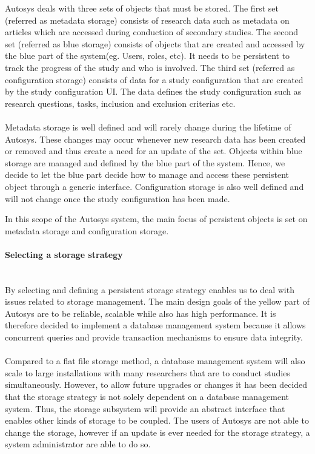 Autosys deals with three sets of objects that must be stored.  The first set (referred as metadata storage) consists of research data such as metadata on articles which are accessed during conduction of secondary studies. The second set (referred as blue storage) consists of objects that are created and accessed by the blue part of the system(eg. Users, roles, etc). It needs to be persistent to track the progress of the study and who is involved. The third set (referred as configuration storage) consists of data for a study configuration that are created by the study configuration UI. The data defines the study configuration such as research questions, tasks, inclusion and exclusion criterias etc.\\\\ 

Metadata storage is well defined and will rarely change during the lifetime of Autosys. These changes may occur whenever new research data has been created or removed and thus create a need for an update of the set. Objects within blue storage are managed and defined by the blue part of the system. Hence, we decide to let the blue part decide how to manage and access these persistent object through a generic interface. Configuration storage is also well defined and will not change once the study configuration has been made.

In this scope of the Autosys system, the main focus of persistent objects is set on metadata storage and configuration storage.

\paragraph{Selecting a storage strategy}\mbox{}\\
By selecting and defining a persistent storage strategy enables us to deal with issues related to storage management. The main design goals of the yellow part of Autosys are to be reliable, scalable while also has high performance. It is therefore decided to implement a database management system because it allows concurrent queries and provide transaction mechanisms to ensure data integrity. \\\\Compared to a flat file storage method, a database management system will also scale to large installations with many researchers that are to conduct studies simultaneously. However, to allow future upgrades or changes it has been decided that the storage strategy is not solely dependent on a database management system. Thus, the storage subsystem will provide an abstract interface that enables other kinds of storage to be coupled. The users of Autosys are not able to change the storage, however if an update is ever needed for the storage strategy, a system administrator are able to do so.     

